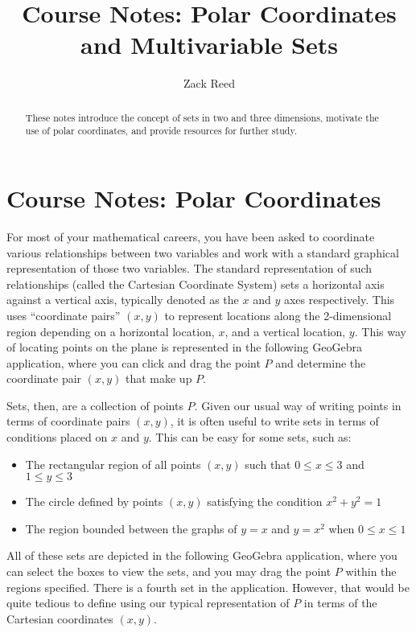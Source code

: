 \documentclass{ximera}
\title{Course Notes: Polar Coordinates and Multivariable Sets}
\author{Zack Reed}
\begin{document}
\begin{abstract}
These notes introduce the concept of sets in two and three dimensions, motivate the use of polar coordinates, and provide resources for further study.
\end{abstract}
\maketitle

\section{Course Notes: Polar Coordinates}

For most of your mathematical careers, you have been asked to coordinate various relationships between two variables and work with a standard graphical representation of those two variables. The standard representation of such relationships (called the Cartesian Coordinate System) sets a horizontal axis against a vertical axis, typically denoted as the $x$ and $y$ axes respectively. This uses ``coordinate pairs'' $(x,y)$ to represent locations along the 2-dimensional region depending on a horizontal location, $x$, and a vertical location, $y$. This way of locating points on the plane is represented in the following GeoGebra application, where you can click and drag the point $P$ and determine the coordinate pair $(x,y)$ that make up $P$.

\begin{center}
\end{center}

Sets, then, are a collection of points $P$. Given our usual way of writing points in terms of coordinate pairs $(x,y)$, it is often useful to write sets in terms of conditions placed on $x$ and $y$. This can be easy for some sets, such as:
\begin{itemize}
    \item The rectangular region of all points $(x,y)$ such that $0 \leq x \leq 3$ and $1 \leq y \leq 3$
    \item The circle defined by points $(x,y)$ satisfying the condition $x^2 + y^2 = 1$
    \item The region bounded between the graphs of $y = x$ and $y = x^2$ when $0 \leq x \leq 1$
\end{itemize}

All of these sets are depicted in the following GeoGebra application, where you can select the boxes to view the sets, and you may drag the point $P$ within the regions specified. There is a fourth set in the application. However, that would be quite tedious to define using our typical representation of $P$ in terms of the Cartesian coordinates $(x,y)$.
\end{document}
